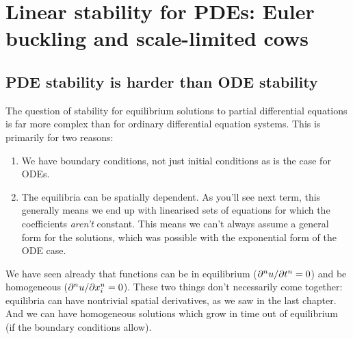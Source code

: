 \documentclass[main.tex]{subfiles}
\begin{document}
%	
%
%

\chapter{Linear stability for PDEs: Euler buckling and scale-limited cows}
\label{chap:linear-stability-pdes}
\section{PDE stability is harder than ODE stability}
The question of stability for equilibrium solutions to partial differential equations is far more complex than for ordinary differential equation systems. This is primarily for two reasons:
\begin{enumerate}
\item{We have boundary conditions, not just initial conditions as is the case for ODEs.}
\item{The equilibria can be spatially dependent. As you'll see next term, this generally means we end up with linearised sets of equations for which the coefficients \emph{aren't} constant. This means we can't always assume a general form for the solutions, which was possible with the exponential form of the ODE case.}
\end{enumerate}

We have seen already that functions can be in equilibrium ($\pdn{n}{u}{t} = 0$) and be homogeneous ($\pdn{n}{u}{x_i} = 0$). 
These two things don't necessarily come together: equilibria can have nontrivial spatial derivatives, as we saw in the last chapter. And we can have homogeneous solutions which grow in time out of equilibrium (if the boundary conditions allow). 
\end{document}
